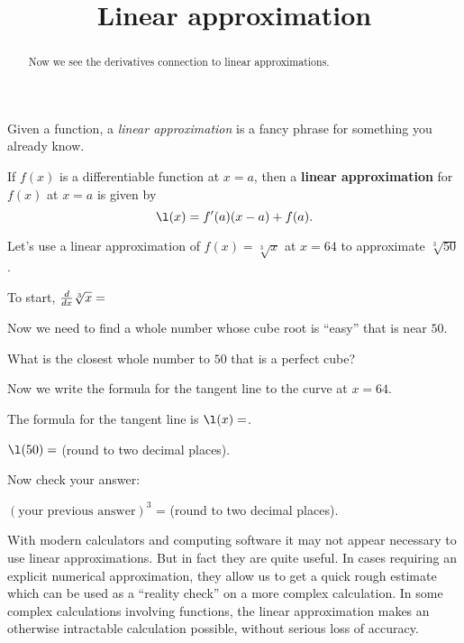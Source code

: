 \documentclass{ximera}
\title{Linear approximation}
\begin{document}
\begin{abstract}
  Now we see the derivatives connection to linear approximations. 
\end{abstract}
\maketitle

Given a function, a \textit{linear approximation} is a fancy phrase
for something you already know.

\begin{definition}
If $f(x)$ is a differentiable function at $x=a$, then a \textbf{linear
  approximation} for $f(x)$ at $x=a$ is given by
\[
\l(x) = f'(a)(x-a) +f(a).
\]
\end{definition}


Let's use a linear approximation of $f(x) =\sqrt[3]{x}$ at $x=64$ to
approximate $\sqrt[3]{50}$.

\begin{question}
To start, $\frac{d}{dx} \sqrt[3]{x} = $
\end{question}

Now we need to find a whole number whose cube root is ``easy'' that is
near $50$.


\begin{question}
What is the closest whole number to $50$ that is a perfect cube?
\end{question}

\begin{question}
Now we write the formula for the tangent line to the curve at $x=64$.

The formula for the tangent line is $\l(x) = $.
\end{question}

\begin{question}
  $\l(50) =$ (round to two decimal places).
\end{question}

Now check your answer:

\begin{question}
$(\text{your previous answer})^3$ =  (round to two
  decimal places).
\end{question}




With modern calculators and computing software it may not appear
necessary to use linear approximations. But in fact they are quite
useful. In cases requiring an explicit numerical approximation, they
allow us to get a quick rough estimate which can be used as a
``reality check'' on a more complex calculation. In some complex
calculations involving functions, the linear approximation makes an
otherwise intractable calculation possible, without serious loss of
accuracy.
\end{document}
